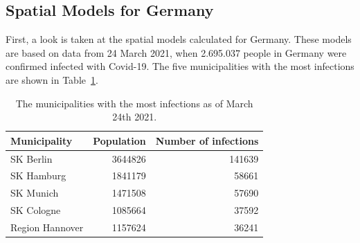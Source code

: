 \subsection{Spatial Models for Germany}
First, a look is taken at the spatial models calculated for Germany. These models are based on data from 24 March 2021, when 2.695.037 people in Germany were confirmed infected with Covid-19. The five municipalities with the most infections are shown in Table~\ref{top5germany}.
\begin{table}[H] 
\caption{The municipalities with the most infections as of March 24th 2021. \label{top5germany}}
\begin{tabular}{l r r}
\toprule
\textbf{Municipality}	& \textbf{Population}	& \textbf{Number of infections} \\
\midrule
SK Berlin & 3644826 & 141639   \\     
SK Hamburg & 1841179 & 58661   \\
SK Munich & 1471508 & 57690   \\
SK Cologne & 1085664 & 37592   \\
Region Hannover & 1157624 & 36241   \\
\bottomrule
\end{tabular}
\end{table}
